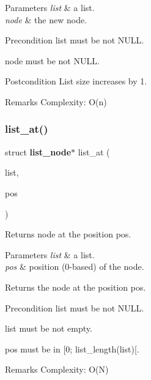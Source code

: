 \begin{DoxyParams}{Parameters}
{\em list} & a list. \\
\hline
{\em node} & the new node.\\
\hline
\end{DoxyParams}
\begin{DoxyPrecond}{Precondition}
{\ttfamily list} must be not N\+U\+LL. 

{\ttfamily node} must be not N\+U\+LL.
\end{DoxyPrecond}
\begin{DoxyPostcond}{Postcondition}
List size increases by 1.
\end{DoxyPostcond}
\begin{DoxyRemark}{Remarks}
Complexity\+: O(n) 
\end{DoxyRemark}
\mbox{\label{list_8c_abcf02e7a58093a7b70a84be889da4aad}} 
\subsubsection{list\+\_\+at()}
{\footnotesize\ttfamily struct \textbf{ list\+\_\+node}$\ast$ list\+\_\+at (\begin{DoxyParamCaption}\item[{const struct \textbf{ list} $\ast$}]{list,  }\item[{size\+\_\+t}]{pos }\end{DoxyParamCaption})}

Returns node at the position {\ttfamily pos}.


\begin{DoxyParams}{Parameters}
{\em list} & a list. \\
\hline
{\em pos} & position (0-\/based) of the node. \\
\hline
\end{DoxyParams}
\begin{DoxyReturn}{Returns}
the node at the position {\ttfamily pos}.
\end{DoxyReturn}
\begin{DoxyPrecond}{Precondition}
{\ttfamily list} must be not N\+U\+LL. 

{\ttfamily list} must be not empty. 

{\ttfamily pos} must be in [0; list\+\_\+length(list)[.
\end{DoxyPrecond}
\begin{DoxyRemark}{Remarks}
Complexity\+: O(\+N) 
\end{DoxyRemark}
\mbox{\label{list_8c_af71fffc666f138957b1e015fdae5fe1f}} 
